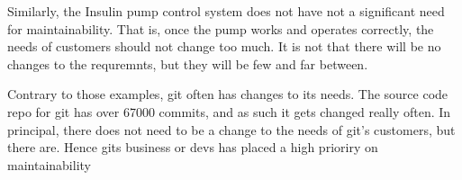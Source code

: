Similarly, the Insulin pump control system does not have not a significant need for maintainability.
That is, once the pump works and operates correctly, the needs of customers should not change too much.
It is not that there will be no changes to the requremnts, but they will be few and far between.

Contrary to those examples, git often has changes to its needs.
The source code repo for git has over 67000 commits, and as such it gets changed really often.
In principal, there does not need to be a change to the needs of git's customers, but there are.
Hence gits business or devs has placed a high prioriry on maintainability




